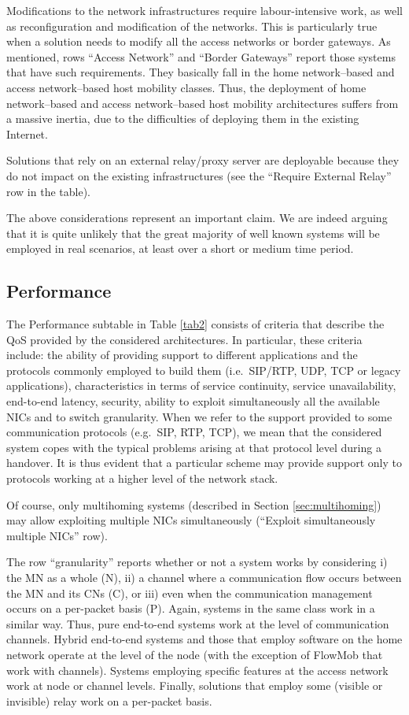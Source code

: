 \documentclass[preprint,12pt]{elsarticle}
\begin{document}
Modifications to the network infrastructures require labour-intensive work, as well as reconfiguration and modification of the networks.
This is particularly true when a solution needs to modify all the access networks or border gateways. 
As mentioned, rows ``Access Network'' and ``Border Gateways'' report those systems that have such requirements.
They basically fall in the home network–based and access network–based host mobility classes.
Thus, the deployment of home network–based and access network–based host mobility architectures suffers from a massive inertia, due to the difficulties of deploying them in the existing Internet.

Solutions that rely on an external relay/proxy server are deployable 
because they do not impact on the existing infrastructures (see the ``Require 
External Relay'' row in the table).

The above considerations represent an important claim. We are indeed arguing 
that it is quite unlikely that the great majority of well known systems will be
employed in real scenarios, at least over a short or medium time period.

\subsection{Performance}

The Performance subtable in Table \ref{tab2} consists of criteria that describe the \ac{QoS} provided by the considered architectures. 
In particular, these criteria include: the ability of providing support 
to different applications and the protocols commonly employed to build them 
(i.e.~SIP/RTP, UDP, TCP or legacy applications), 
characteristics in terms of service continuity, service unavailability, end-to-end latency, security, ability to exploit simultaneously all the available NICs and to switch granularity. 
When we refer to the support provided to some communication protocols (e.g.~SIP, RTP, TCP), we mean that the considered system copes with the typical problems arising at that protocol level during a handover. 
It is thus evident that a particular scheme may provide support only to protocols working at a higher level of the network stack.

Of course, only multihoming systems (described in Section 
\ref{sec:multihoming}) may allow exploiting multiple NICs simultaneously 
(``Exploit simultaneously multiple NICs'' row). 

The row ``granularity'' reports whether or not a system works by considering i) the MN as a 
whole (N), ii) a channel where a communication flow occurs between the MN and its 
CNs (C), or iii) even when the communication management occurs on a per-packet 
basis (P). Again, systems in the same class work in a similar way. 
Thus, pure end-to-end systems work at the level of communication channels. 
Hybrid end-to-end systems and those that employ software on the home network 
operate at the level of the node (with the exception of FlowMob that work with 
channels). Systems employing specific features at the access network work at 
node or channel levels. Finally, solutions that employ some (visible or 
invisible) relay work on a per-packet basis.
\end{document}
